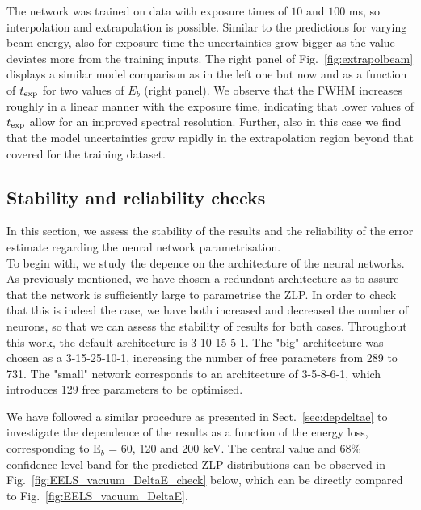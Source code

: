 The network was trained on data with exposure times of $10$ and $100$ ms,
so interpolation and extrapolation is possible. Similar to the predictions for varying beam energy, also for exposure time the uncertainties grow bigger as the value deviates more from the training inputs.
%
The right panel of Fig.~\ref{fig:extrapolbeam} displays a similar model
comparison as in the left one but now and as a function of $t_{\rm exp}$ for two values of $E_b$ (right panel).
%
We observe that the FWHM increases roughly in a linear manner with the exposure time, indicating
that lower values of $t_{\rm exp}$ allow for an improved spectral resolution.
%
Further, also in this case we find that the model uncertainties grow rapidly in the
extrapolation region beyond that covered for the training dataset.


\subsection{Stability and reliability checks}
In this section, we assess the stability of the results and the reliability of the 
error estimate regarding the neural network parametrisation.\\

To begin with, we study the depence on the architecture of the neural networks. 
As previously mentioned, we have chosen a redundant architecture as to assure that the network
is sufficiently large to parametrise the ZLP.
%
In order to check that this is indeed the case, we have both increased and decreased the
number of neurons, so that we can assess the stability of results for both cases.
%
Throughout this work, the default architecture is 3-10-15-5-1. 
The "big" architecture was chosen as a 3-15-25-10-1, increasing the number of free
parameters from 289 to 731. 
%
The "small" network corresponds to an architecture of 3-5-8-6-1, which introduces 129
free parameters to be optimised. 

We have followed a similar procedure as presented in Sect.~\ref{sec:depdeltae} to investigate
the dependence of the results as a function of the energy loss, corresponding to 
E$_b$ = 60, 120 and 200 keV. 
%
The central value and 68\% confidence level band for the predicted ZLP distributions
can be observed in Fig.~\ref{fig:EELS_vacuum_DeltaE_check} below, which can be directly
compared to Fig.~\ref{fig:EELS_vacuum_DeltaE}. 

